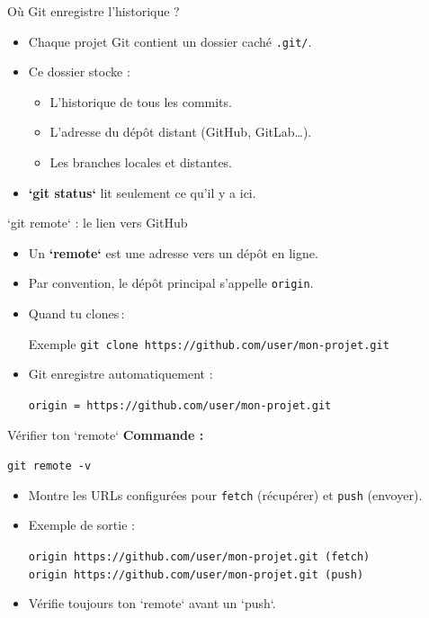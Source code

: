\documentclass{beamer}
\begin{document}
\begin{frame}{Où Git enregistre l’historique ?}
	\begin{itemize}
		\item Chaque projet Git contient un dossier caché \texttt{.git/}.
		\item Ce dossier stocke :
		\begin{itemize}
			\item L’historique de tous les commits.
			\item L’adresse du dépôt distant (GitHub, GitLab…).
			\item Les branches locales et distantes.
		\end{itemize}
		\item \textbf{`git status`} lit seulement ce qu’il y a ici.
	\end{itemize}
\end{frame}

\begin{frame}{`git remote` : le lien vers GitHub}
	\begin{itemize}
		\item Un \textbf{`remote`} est une adresse vers un dépôt en ligne.
		\item Par convention, le dépôt principal s’appelle \texttt{origin}.
		\item Quand tu clones :
		\begin{block}{Exemple}
			\texttt{git clone https://github.com/user/mon-projet.git}
		\end{block}
		\item Git enregistre automatiquement :
		\begin{block}{}
			\texttt{origin = https://github.com/user/mon-projet.git}
		\end{block}
	\end{itemize}
\end{frame}

\begin{frame}{Vérifier ton `remote`}
	\textbf{Commande :}
	\begin{block}{}
		\texttt{git remote -v}
	\end{block}
	
	\begin{itemize}
		\item Montre les URLs configurées pour \texttt{fetch} (récupérer) et \texttt{push} (envoyer).
		\item Exemple de sortie :
		\begin{block}{}
			\texttt{origin  https://github.com/user/mon-projet.git (fetch)}\\
			\texttt{origin  https://github.com/user/mon-projet.git (push)}
		\end{block}
		\item Vérifie toujours ton `remote` avant un `push`.
	\end{itemize}
\end{frame}
\end{document}
